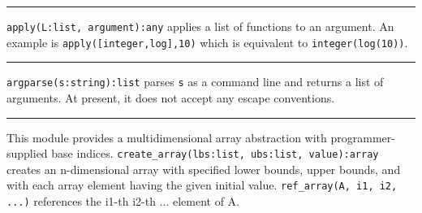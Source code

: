 % 
% 

\vspace{0.25cm}\hrule{}

\texttt{apply(L:list, argument):any} applies a list of
functions to an argument. An example is
\texttt{apply([integer,log],10)} which is equivalent to
\texttt{integer(log(10))}. 

\vspace{0.25cm}\hrule{}

\texttt{argparse(s:string):list} parses \texttt{s} as a
command line and returns a list of arguments. At
present, it does not accept any escape conventions. 

\vspace{0.25cm}\hrule{}

This module provides a multidimensional
array abstraction with programmer-supplied base indices.
\texttt{create\_array(lbs:list, ubs:list, value):array} creates an
n-dimensional array with specified lower bounds, upper bounds, and with
each array element having the given initial value.
\texttt{ref\_array(A, i1, i2, ...)} references the i1-th i2-th ...
element of A. 

